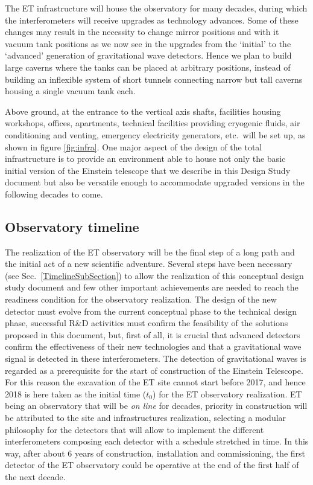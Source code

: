 The ET infrastructure will house the observatory for many decades, during which 
the interferometers will receive upgrades as technology advances. Some of these 
changes may result in the necessity to change mirror positions and with it vacuum 
tank positions as we now see in the upgrades from the `initial' to the `advanced' 
generation of gravitational wave detectors. Hence we plan to build large caverns 
where the tanks can be placed at arbitrary positions, instead of building an inflexible 
system of short tunnels connecting narrow but tall caverns housing a single vacuum 
tank each.  

Above ground, at the entrance to the vertical axis shafts, facilities housing workshops, 
offices, apartments, technical facilities providing cryogenic fluids, air conditioning 
and venting, emergency electricity generators, etc.\ will be set up, as shown in figure 
\ref{fig:infra}. 
One major aspect of the design of the total infrastructure is to provide an environment 
able to house not only the basic initial version of the Einstein telescope that we 
describe in this Design Study document but also be versatile enough to accommodate 
upgraded versions in the following decades to come.   
\FloatBarrier
\subsection{Observatory timeline}
The realization of the ET observatory will be the final step of a long path and the initial 
act of a new scientific adventure. Several steps have been necessary (see 
Sec.~\ref{TimelineSubSection}) to allow the realization of this conceptual design study 
document  and few other important achievements are needed to reach the readiness 
condition for the observatory realization. The design of the new detector must evolve 
from the current conceptual phase to the technical design phase, successful R\&D 
activities must confirm the feasibility of the solutions proposed in this document, but, 
first of all, it is crucial that advanced detectors confirm the effectiveness of their new 
technologies and that a gravitational wave signal is detected in these interferometers. 
The detection of gravitational waves is regarded as a prerequisite for the start of 
construction of the Einstein Telescope.
For this reason the excavation of the ET site cannot start before 2017, and hence 2018 
is here taken as the initial time ($t_0$) for the ET observatory realization. ET being 
an observatory that will be \emph{on line} for decades, priority in construction 
will be attributed to the site and infrastructures realization, selecting a modular 
philosophy for the detectors that will allow to implement the different interferometers 
composing each detector with a schedule stretched in time. In this way, after about 6 
years of construction, installation and commissioning, the first detector of the ET 
observatory could be operative at the end of the first half of the next decade.
\FloatBarrier
